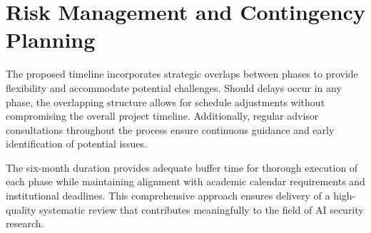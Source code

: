 \documentclass[twoside,brazilian,english]{UNISINOSmonografia}
\begin{document}
\section{Risk Management and Contingency Planning}

The proposed timeline incorporates strategic overlaps between phases to provide flexibility and accommodate potential challenges. Should delays occur in any phase, the overlapping structure allows for schedule adjustments without compromising the overall project timeline. Additionally, regular advisor consultations throughout the process ensure continuous guidance and early identification of potential issues.

The six-month duration provides adequate buffer time for thorough execution of each phase while maintaining alignment with academic calendar requirements and institutional deadlines. This comprehensive approach ensures delivery of a high-quality systematic review that contributes meaningfully to the field of AI security research.







\end{document}
